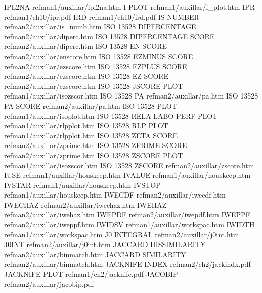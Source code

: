 IPL2NA                                  refman1/auxillar/ipl2na.htm
I PLOT                                  refman1/auxillar/i_plot.htm
IPR                                     refman1/ch10/ipr.pdf
IRD                                     refman1/ch10/ird.pdf
IS NUMBER                               refman2/auxillar/is_numb.htm
ISO 13528 DIPERCENTAGE                  refman2/auxillar/diperc.htm
ISO 13528 DIPERCENTAGE SCORE            refman2/auxillar/diperc.htm
ISO 13528 EN SCORE                      refman2/auxillar/enscore.htm
ISO 13528 EZMINUS SCORE                 refman2/auxillar/ezscore.htm
ISO 13528 EZPLUS SCORE                  refman2/auxillar/ezscore.htm
ISO 13528 EZ SCORE                      refman2/auxillar/ezscore.htm
ISO 13528 JSCORE PLOT                   refman1/auxillar/isozscor.htm
ISO 13528 PA                            refman2/auxillar/pa.htm
ISO 13528 PA SCORE                      refman2/auxillar/pa.htm
ISO 13528 PLOT                          refman1/auxillar/isoplot.htm
ISO 13528 RELA LABO PERF PLOT           refman1/auxillar/rlpplot.htm
ISO 13528 RLP PLOT                      refman1/auxillar/rlpplot.htm
ISO 13528 ZETA SCORE                    refman2/auxillar/zprime.htm
ISO 13528 ZPRIME SCORE                  refman2/auxillar/zprime.htm
ISO 13528 ZSCORE PLOT                   refman1/auxillar/isozscor.htm
ISO 13528 ZSCORE                        refman2/auxillar/zscore.htm
IUSE                                    refman1/auxillar/houskeep.htm
IVALUE                                  refman1/auxillar/houskeep.htm
IVSTAR                                  refman1/auxillar/houskeep.htm
IVSTOP                                  refman1/auxillar/houskeep.htm
IWECDF                                  refman2/auxillar/iwecdf.htm
IWECHAZ                                 refman2/auxillar/iwechaz.htm
IWEHAZ                                  refman2/auxillar/iwehaz.htm
IWEPDF                                  refman2/auxillar/iwepdf.htm
IWEPPF                                  refman2/auxillar/iweppf.htm
IWIDSV                                  refman1/auxillar/workspac.htm
IWIDTH                                  refman1/auxillar/workspac.htm
J0 INTEGRAL                             refman2/auxillar/j0int.htm
J0INT                                   refman2/auxillar/j0int.htm
JACCARD DISSIMILARITY                   refman2/auxillar/binmatch.htm
JACCARD SIMILARITY                      refman2/auxillar/binmatch.htm
JACKNIFE INDEX                          refman2/ch2/jackindx.pdf
JACKNIFE PLOT                           refman1/ch2/jacknife.pdf
JACOBIP                                 refman2/auxillar/jacobip.pdf
